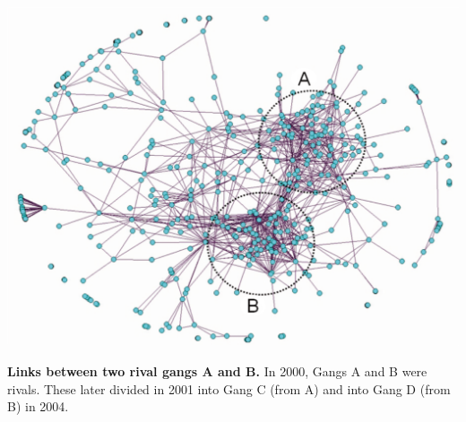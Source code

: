 \documentclass[pdftex]{beamer}
\begin{document}
\begin{frame}
\begin{center}
\includegraphics[width=0.8\paperwidth]{../images/2000ganglabels.pdf}
\end{center}
\scriptsize{{\textbf{Links between two rival gangs A and B.}} In 2000,
  Gangs A and B were rivals. These later divided in 2001 into Gang C
  (from A) and into Gang D (from B) in 2004.}
\end{frame}

{ %
    \begin{frame}[plain]
     \end{frame}
}
\end{document}
